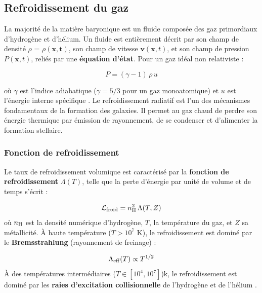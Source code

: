 \documentclass{article}
\begin{document}
\subsection{ Refroidissement du gaz}

La majorité de la matière baryonique \cite{Vogelsberger_Galaxy_2014} est un fluide composée des gaz primordiaux d'hydrogène et d'hélium. 
Un fluide est entièrement décrit par son champ de densité 
$\rho$ = $\rho(\mathbf{x}, \mathbf{t})$, 
son champ de vitesse $\mathbf{v}(\mathbf{x}, t)$, et son champ de pression 
$P(\mathbf{x}, t)$, reliés par une \textbf{équation d'état}. Pour un gaz 
idéal non relativiste :

\begin{equation}
    P = (\gamma - 1)\, \rho\, u  
    \label{eq:etat}
\end{equation}

\noindent où $\gamma$ est l'indice adiabatique ($\gamma = 5/3$ pour un gaz 
monoatomique) et $u$ est l'énergie interne spécifique \cite{Katz1996}. Le refroidissement radiatif est l'un des mécanismes fondamentaux de la 
formation des galaxies. Il permet au gaz chaud de perdre son énergie 
thermique par émission de rayonnement, de se condenser et d'alimenter 
la formation stellaire.

\subsubsection{Fonction de refroidissement}
Le taux de refroidissement volumique est caractérisé par la 
\textbf{fonction de refroidissement} $\Lambda(T)$, telle que la perte 
d'énergie par unité de volume et de temps s'écrit :

\begin{equation}
    \mathcal{L}_{\rm froid} = n_{\rm H}^2\, \Lambda(T, Z)
    \label{eq:cooling_rate}
\end{equation}
\bigskip
\noindent où $n_{\rm H}$ est la densité numérique d'hydrogène, $T$, la température du gaz, et $Z$ sa métallicité. 
À haute température ($T > 10^7$ K), le refroidissement est dominé par le \textbf{Bremsstrahlung} (rayonnement de freinage) :

\begin{equation}
    \Lambda_{\rm eff}(T) \propto T^{1/2}
    \label{eq:bremsstrahlung}
\end{equation}
\noindent À des températures intermédiaires (\( T \in [10^4, 10^7] \))k, 
le refroidissement est dominé par les \textbf{raies d'excitation collisionnelle} 
de l'hydrogène et de l'hélium \cite{Katz1996}.
\end{document}

